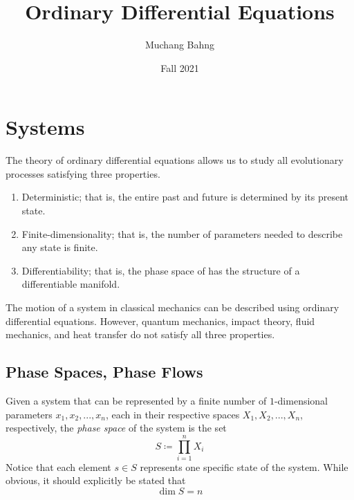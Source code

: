\documentclass{article}
\newcounter{definition}[section]
\begin{document}
\title{Ordinary Differential Equations}
\author{Muchang Bahng}
\date{Fall 2021}

\maketitle
\tableofcontents
\pagebreak

\section{Systems}

  The theory of ordinary differential equations allows us to study all evolutionary processes satisfying three properties. 
  \begin{enumerate}
    \item Deterministic; that is, the entire past and future is determined by its present state. 
    \item Finite-dimensionality; that is, the number of parameters needed to describe any state is finite. 
    \item Differentiability; that is, the phase space of has the structure of a differentiable manifold. 
  \end{enumerate}
  The motion of a system in classical mechanics can be described using ordinary differential equations. However, quantum mechanics, impact theory, fluid mechanics, and heat transfer do not satisfy all three properties. 

  \subsection{Phase Spaces, Phase Flows}

    \begin{definition}
      \label{def:phase-space}
      Given a system that can be represented by a finite number of $1$-dimensional parameters $x_1, x_2, ..., x_n$, each in their respective spaces $X_1, X_2, ..., X_n$, respectively, the \textit{phase space} of the system is the set
      \begin{equation}
        S \coloneqq \prod_{i=1}^n X_i
      \end{equation}
      Notice that each element $s \in S$ represents one specific state of the system. While obvious, it should explicitly be stated that 
      \begin{equation}
        \dim{S} = n
      \end{equation}
    \end{definition}
\end{document}
